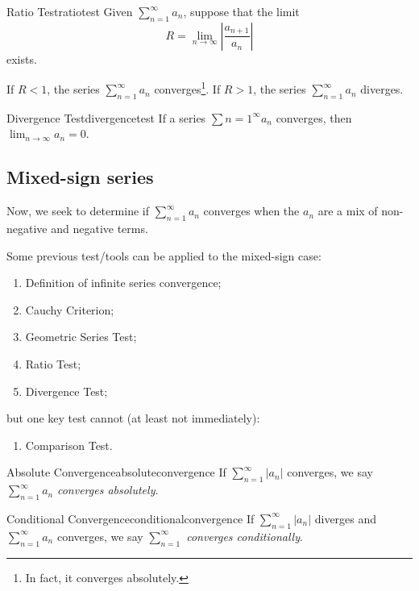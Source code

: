 
\begin{thm}{Ratio Test}{ratiotest}
	Given \(\sum_{n=1}^\infty a_n\), suppose that the limit \[
		R = \lim_{n\to\infty} \left|\frac{a_{n+1}}{a_n}\right|
	\]
	exists.

	If \(R < 1\), the series \(\sum_{n=1}^\infty a_n\) converges\footnote{In fact, it converges absolutely.}. If \(R > 1\), the series \(\sum_{n=1}^\infty a_n\) diverges.
\end{thm}

\begin{thm}{Divergence Test}{divergencetest}
	If a series \(\sum{n=1}^\infty a_n\) converges, then \(\lim_{n\to\infty} a_n = 0\).
\end{thm}

\subsection{Mixed-sign series}

Now, we seek to determine if \(\sum_{n=1}^\infty a_n\) converges when the \(a_n\) are a mix of non-negative and negative terms.

Some previous test/tools can be applied to the mixed-sign case:
\begin{enumerate}[label = \textbullet]
	\item Definition of infinite series convergence;
	\item Cauchy Criterion;
	\item Geometric Series Test;
	\item Ratio Test;
	\item Divergence Test;
\end{enumerate}
but one key test cannot (at least not immediately):
\begin{enumerate}[label = \textbullet]
	\item Comparison Test.
\end{enumerate}

\begin{defn}{Absolute Convergence}{absoluteconvergence}
	If \(\sum_{n=1}^\infty |a_n|\) converges, we say \(\sum_{n=1}^\infty a_n\) \emph{converges absolutely}.
\end{defn}

\begin{defn}{Conditional Convergence}{conditionalconvergence}
	If \(\sum_{n=1}^\infty |a_n|\) diverges and \(\sum_{n=1}^\infty a_n\) converges, we say \(\sum_{n=1}^\infty\) \emph{converges conditionally}.
\end{defn}

